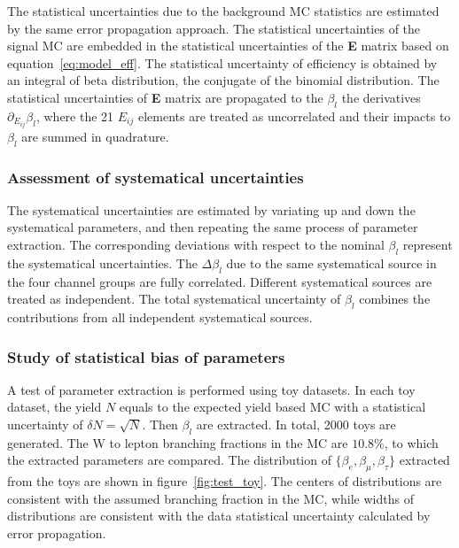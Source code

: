 The statistical uncertainties due to the background 
MC statistics are estimated by the same error propagation approach.
The statistical uncertainties of the signal MC are embedded in the statistical uncertainties 
of the \textbf{E} matrix based on equation~\ref{eq:model_eff}. The statistical uncertainty of 
efficiency is obtained by an integral of beta distribution, the conjugate of the
binomial distribution. The statistical uncertainties of \textbf{E} matrix are 
propagated to the $\beta_l$ the derivatives $\partial_{E_{ij}} \beta_l$, where the 
21 $E_{ij}$ elements are treated as uncorrelated and their impacts to $\beta_l$ are 
summed in quadrature. 


\subsubsection{Assessment of systematical uncertainties}

The systematical uncertainties are estimated by variating up and down the systematical parameters, and then
repeating the same process of parameter extraction. The corresponding deviations with respect to the nominal $\beta_l$
represent the systematical uncertainties. The $\Delta \beta_l$ due to the same systematical source in the four
channel groups are fully correlated. Different systematical sources are treated as independent. 
The total systematical uncertainty of $\beta_l$ combines the contributions from all independent systematical sources.


\subsubsection{Study of statistical bias of parameters}
A test of parameter extraction is performed using toy datasets.
In each toy dataset, the yield $N$ equals to the expected yield based MC with 
a statistical uncertainty of $\delta N = \sqrt{N}$. Then $\beta_l$ are 
extracted. In total, 2000 toys are generated. The W to lepton branching 
fractions in the MC are $10.8\%$, to which the extracted parameters are compared.
The distribution of $\{\beta_{e},\beta_{\mu},\beta_{\tau}\}$ extracted from the toys are shown in
figure~\ref{fig:test_toy}. The centers of distributions are consistent with
the assumed branching fraction in the MC, while widths of distributions are 
consistent with the data statistical uncertainty calculated by error propagation.





